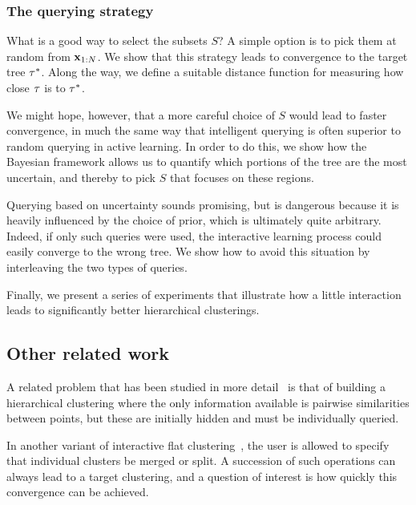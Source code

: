 \subsubsection*{The querying strategy}

What is a good way to select the subsets $S$? A simple option is to pick them at random from $\mathbf{x}_{1:N}$. We show that this strategy leads to convergence to the target tree $\tau^*$. Along the way, we define a suitable distance function for measuring how close $\tau$ is to $\tau^*$. 


We might hope, however, that a more careful choice of $S$ would lead to faster convergence, in much the same way that intelligent querying is often superior to random querying in active learning. In order to do this, we show how the Bayesian framework allows us to quantify which portions of the tree are the most uncertain, and thereby to pick $S$ that focuses on these regions.

Querying based on uncertainty sounds promising, but is dangerous because it is heavily influenced by the choice of prior, which is ultimately quite arbitrary. Indeed, if only such queries were used, the interactive learning process could easily converge to the wrong tree. We show how to avoid this situation by interleaving the two types of queries.

Finally, we present a series of experiments that illustrate how a little interaction leads to significantly better hierarchical clusterings.


\subsection{Other related work}

A related problem that has been studied in more detail~\citep{Zoller2000,Eriksson2011,Krishnamurthy2012} is that of building a hierarchical clustering where the only information available is pairwise similarities between points, but these are initially hidden and must be individually queried.

In another variant of interactive flat clustering~\citep{Balcan2008,Awasthi2010,Awasthi2013}, the user is allowed to specify that individual clusters be merged or split. A succession of such operations can always lead to a target clustering, and a question of interest is how quickly this convergence can be achieved.

